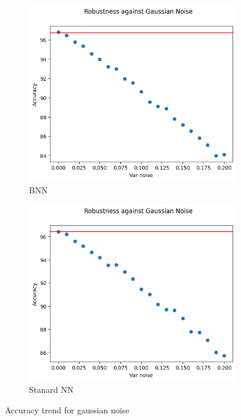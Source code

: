 \begin{figure}[h]
	\centering
	\begin{subfigure}{.5\textwidth}
		\centering
		\includegraphics[width=0.9\linewidth]{ImageFiles/EvalBNN/GN/WU/acc}
		\caption{BNN}
		\label{fig:gn_acc_wu_bnn}
	\end{subfigure}%
	\begin{subfigure}{.5\textwidth}
		\centering
		\includegraphics[width=0.9\linewidth]{ImageFiles/EvalANN/gaus_noise_ann}
		\caption{Stanard NN}
		\label{fig:gaus_noise_ann}
	\end{subfigure}
	\caption{Accuracy trend for gaussian noise}
	\label{fig:acc_gn_wu}
\end{figure}

